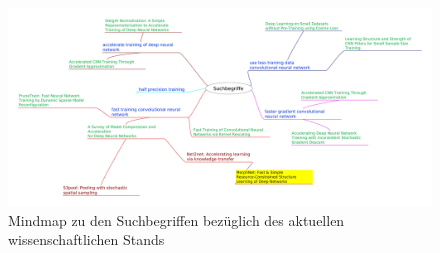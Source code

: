 \begin{figure}[h]
 \centering
 \includegraphics[width=1\textwidth]{KapitelPartA/images/mindmap.jpg}
 \caption{Mindmap zu den Suchbegriffen bezüglich des aktuellen wissenschaftlichen Stands}
 \label{abb:mindmap}
\end{figure}


